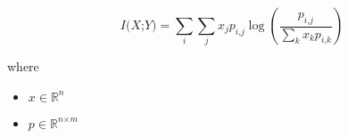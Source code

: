 \documentclass[12pt]{article}
\begin{document}
\[
\textit{I(X;Y)} = \sum_\textit{i} \sum_\textit{j} \textit{x}_{ \textit{j} }\textit{p}_{\textit{i}, \textit{j}} \log{(\frac{\textit{p}_{\textit{i}, \textit{j}}}{\sum_\textit{k} \textit{x}_{ \textit{k} }\textit{p}_{\textit{i}, \textit{k}}})}
\]

where
\begin{itemize}
\item $\textit{x} \in \mathbb{R}^{ \textit{n}}$
\item $\textit{p} \in \mathbb{R}^{ \textit{n} \times \textit{m} }$
\end{itemize}
\end{document}
